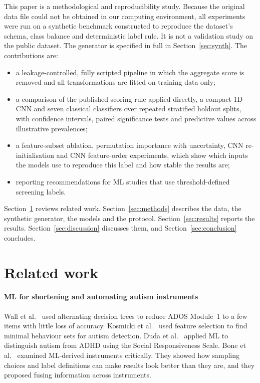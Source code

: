 \documentclass[5p,times,twocolumn]{elsarticle}
\begin{document}
This paper is a methodological and reproducibility study. Because the original data file could not be obtained in our computing environment, all experiments were run on a synthetic benchmark constructed to reproduce the dataset's schema, class balance and deterministic label rule. It is not a validation study on the public dataset. The generator is specified in full in Section~\ref{sec:synth}. The contributions are:
\begin{itemize}
\item a leakage-controlled, fully scripted pipeline in which the aggregate score is removed and all transformations are fitted on training data only;
\item a comparison of the published scoring rule applied directly, a compact 1D CNN and seven classical classifiers over \NSplits{} repeated stratified holdout splits, with confidence intervals, paired significance tests and predictive values across illustrative prevalences;
\item a feature-subset ablation, permutation importance with uncertainty, CNN re-initialisation and CNN feature-order experiments, which show which inputs the models use to reproduce this label and how stable the results are;
\item reporting recommendations for ML studies that use threshold-defined screening labels.
\end{itemize}

Section~\ref{sec:related} reviews related work. Section~\ref{sec:methods} describes the data, the synthetic generator, the models and the protocol. Section~\ref{sec:results} reports the results. Section~\ref{sec:discussion} discusses them, and Section~\ref{sec:conclusion} concludes.

\section{Related work}
\label{sec:related}

\paragraph{ML for shortening and automating autism instruments}
Wall et al.\ \cite{wall2012} used alternating decision trees to reduce ADOS Module~1 to a few items with little loss of accuracy. Kosmicki et al.\ \cite{kosmicki2015} used feature selection to find minimal behaviour sets for autism detection. Duda et al.\ \cite{duda2016} applied ML to distinguish autism from ADHD using the Social Responsiveness Scale. Bone et al.\ \cite{bone2016} examined ML-derived instruments critically. They showed how sampling choices and label definitions can make results look better than they are, and they proposed fusing information across instruments.
\end{document}

